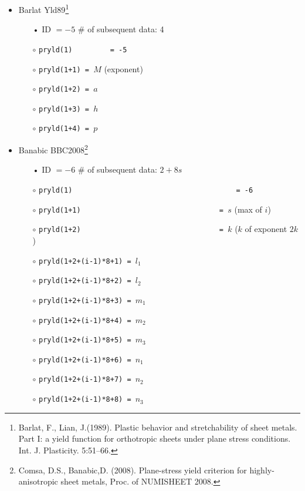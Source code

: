 \documentclass[11pt,a4paper,twoside,final,onecolumn,titlepage]{article}
\begin{document}
\begin{itemize}
	\item Barlat Yld89\footnote{Barlat, F., Lian, J.(1989). Plastic behavior and stretchability of sheet metals. Part I: a yield function for orthotropic sheets under plane stress conditions. Int. J. Plasticity. 5:51–66.}
	\begin{itemize}
		\item[•] ID $= -5$ \hspace{98pt} \# of subsequent data: 4
		\item[$\circ$] \texttt{pryld(1)\,\,\,\,\,\,\,\,\,= -5}
		\item[$\circ$] \texttt{pryld(1+1) = $M$} (exponent)
		\item[$\circ$] \texttt{pryld(1+2) = $a$}
		\item[$\circ$] \texttt{pryld(1+3) = $h$}
		\item[$\circ$] \texttt{pryld(1+4) = $p$}\\
	\end{itemize}
\end{itemize}

\begin{itemize}
	\item Banabic BBC2008\footnote{Comsa, D.S., Banabic,D. (2008). Plane-stress yield criterion for highly-anisotropic sheet metals, Proc. of NUMISHEET 2008.}
	\begin{itemize}
		\item[•] ID $= -6$ \hspace{98pt} \# of subsequent data: $2+8s$
		\item[$\circ$] \texttt{pryld(1)\,\,\,\,\,\,\,\,\,\,\,\,\,\,\,\,\,\,\,\,\,\,\,\,\,\,\,\,\,\,\,\,\,\,\,\,\,\,\,= -6}
		\item[$\circ$] \texttt{pryld(1+1)\,\,\,\,\,\,\,\,\,\,\,\,\,\,\,\,\,\,\,\,\,\,\,\,\,\,\,\,\,\,\,\,\,= $s$} (max of $i$)
		\item[$\circ$] \texttt{pryld(1+2)\,\,\,\,\,\,\,\,\,\,\,\,\,\,\,\,\,\,\,\,\,\,\,\,\,\,\,\,\,\,\,\,\,= $k$} ($k$ of exponent $2k$)
		\item[$\circ$] \texttt{pryld(1+2+(i-1)*8+1) = $l_1$}
		\item[$\circ$] \texttt{pryld(1+2+(i-1)*8+2) = $l_2$}
		\item[$\circ$] \texttt{pryld(1+2+(i-1)*8+3) = $m_1$}
		\item[$\circ$] \texttt{pryld(1+2+(i-1)*8+4) = $m_2$}
		\item[$\circ$] \texttt{pryld(1+2+(i-1)*8+5) = $m_3$}
		\item[$\circ$] \texttt{pryld(1+2+(i-1)*8+6) = $n_1$}
		\item[$\circ$] \texttt{pryld(1+2+(i-1)*8+7) = $n_2$}
		\item[$\circ$] \texttt{pryld(1+2+(i-1)*8+8) = $n_3$}\\
	\end{itemize}
\end{itemize}
\end{document}
